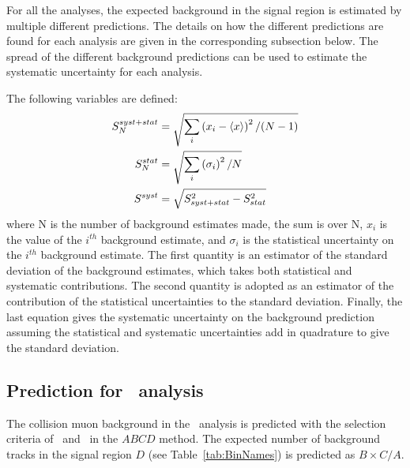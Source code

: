For all the analyses, the expected background in the signal region is estimated by multiple different predictions.
The details on how the different predictions are found for each analysis are given in the corresponding subsection below.
The spread of the different background predictions can be used to estimate the systematic uncertainty for each analysis.

The following variables are defined:
\begin{equation}
\centering
\begin{split}
S^{syst+stat}_{N} &= \sqrt{\sum_i \left( x_i - \langle x \rangle  \right) ^2/(N-1)} \\
S^{stat}_{N} &= \sqrt{\sum_i \left( \sigma _i \right) ^2/N} \\
S^{syst} &= \sqrt{S_{syst+stat}^2-S_{stat}^2} \\
\end{split}
\label{eq:variance}
\end{equation}
where N is the number of background estimates made,
the sum is over N, $x_i$ is the value of the $i^{th}$ background estimate,
and $\sigma_i$ is the statistical uncertainty on
the $i^{th}$ background estimate. The first quantity is an estimator of the
standard deviation of the background estimates, which takes both statistical
and systematic contributions. The second quantity is adopted as an
estimator of the contribution of the statistical uncertainties
to the standard deviation. Finally, the last equation gives the systematic uncertainty on the background prediction assuming
the statistical and systematic uncertainties add in quadrature to give the standard deviation.

\subsection{Prediction for \muononly\ analysis \label{sec:MuOnlyPred}}

The collision muon  background in the \muononly\ analysis is predicted with the selection criteria of \invbeta\ and \pt\ in the $ABCD$  method.
The expected number of background tracks in the signal region $D$ (see Table~\ref{tab:BinNames}) is predicted as $B \times C / A$. 

